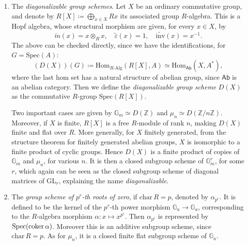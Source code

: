 \documentclass[../Main]{subfiles}
\begin{document}
\begin{ex}
\begin{enumerate}
		\item The {\em diagonalizable group schemes}. Let $X$ be an ordinary
			commutative group, and denote by $R[X] \coloneqq \bigoplus_{x \in X} Rx$
			its associated group $R$-algebra.
			This is a Hopf algebra, whose structural morphism
			are given, for every $x \in X$, by
			\begin{equation*}
				\widetilde{m}(x) = x \otimes_R x,
				\quad
				\widetilde{\varepsilon}(x) = 1,
				\quad
				\widetilde{\mathrm{inv}}(x) = x^{-1}
			.\end{equation*} 
			The above can be checked directly, since we have
			the identifications, for $G = \mathrm{Spec}(A)$:
			\begin{equation*}
				\left( D(X) \right)(G) \coloneqq
				\mathrm{Hom}_{R \text{-Alg}} \left( R[X], A \right) \simeq
				\mathrm{Hom}_{\mathsf{Ab}} \left( X, A^* \right)
			,\end{equation*} 
			where the last hom set has a natural structure of abelian
			group, since $\mathsf{Ab}$ is an abelian category.
			Then we define the {\em diagonalizable group scheme} $D(X)$
			as the commutative $R$-group $\mathrm{Spec}(R[X])$.

			Two important cases are given by $\mathbb{G}_m \simeq D(\mathbb{Z})$
			and $\mu_n \simeq D(\mathbb{Z}/n\mathbb{Z})$.
			Moreover, if $X$ is finite, $R[X]$ is a free $R$-module of rank $n$,
			making $D(X)$ finite and flat over $R$.
			More generally, for $X$ finitely generated, 
			from the structure theorem for finitely generated abelian groups, 
			$X$ is isomorphic to a finite product of cyclic groups.
			Hence $D(X)$ is a finite product of copies of $\mathbb{G}_m$
			and $\mu_n$, for various $n$.
			It is then a closed subgroup scheme of $\mathbb{G}_m^r$, for some $r$,
			which again can be seen as the closed subgroup scheme of diagonal
			matrices of $\mathrm{GL}_r$, explaining the name 
			{\em diagonalizable}.


		\item The {\em group scheme of $p^r$-th roots of zero},
			if $\mathrm{char}\, R = p$, denoted by $\alpha_{p^r}$. 
			It is defined to be the kernel of the $p^r$-th power
			morphism $\mathbb{G}_a \to \mathbb{G}_a$,
			corresponding to the $R$-algebra morphism
			$\alpha\colon x \mapsto x^{p^r}$.
			Then $\alpha_{p^r}$ is represented by $\mathrm{Spec}(\operatorname{coker} \alpha)$.
			Moreover this is an additive subgroup scheme, since $\mathrm{char}\, R = p$.
			As for $\mu_n$, it is a closed finite flat subgroup scheme of 
			$\mathbb{G}_a$.
	\end{enumerate}
\end{ex}
\end{document}
